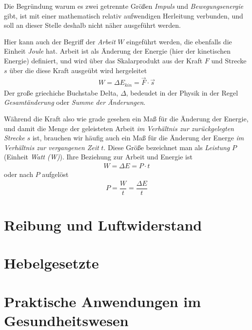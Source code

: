 Die Begründung warum es zwei getrennte Größen \textit{Impuls} und \textit{Bewegungsenergie} gibt, ist mit einer mathematisch relativ aufwendigen Herleitung verbunden, und soll an dieser Stelle deshalb nicht näher ausgeführt werden.

Hier kann auch der Begriff der \textit{Arbeit} $W$ eingeführt werden, die ebenfalls die Einheit \textit{Joule} hat. Arbeit ist als Änderung der Energie (hier der kinetischen Energie) definiert, und wird über das Skalarprodukt aus der Kraft $F$ und Strecke $s$ über die diese Kraft ausgeübt wird hergeleitet
\begin{eqnarray}
W = \Delta E_{kin}=\vec{F}\cdot \vec{s}
\end{eqnarray} 
Der große griechiche Buchstabe Delta, $\Delta$, bedeudet in der Physik in der Regel \textit{Gesamtänderung} oder \textit{Summe der Änderungen}.

Während die Kraft also wie grade gesehen ein Maß für die Änderung der Energie, und damit die Menge der geleisteten Arbeit \textit{im Verhältnis zur zurückgelegten Strecke} $s$ ist, brauchen wir häufig auch ein Maß für die Änderung der Energe \textit{im Verhältnis zur vergangenen Zeit} $t$. Diese Größe bezeichnet man als \textit{Leistung} $P$ (Einheit \textit{Watt (W)}). Ihre Beziehung zur Arbeit und Energie ist 
\begin{eqnarray}
W = \Delta E = P\cdot t
\end{eqnarray}
oder nach $P$ aufgelöst
\begin{eqnarray}
P = \dfrac{W}{t} = \dfrac{\Delta E}{t}
\end{eqnarray}

\section{Reibung und Luftwiderstand}

\section{Hebelgesetzte}


\section{Praktische Anwendungen im Gesundheitswesen}

